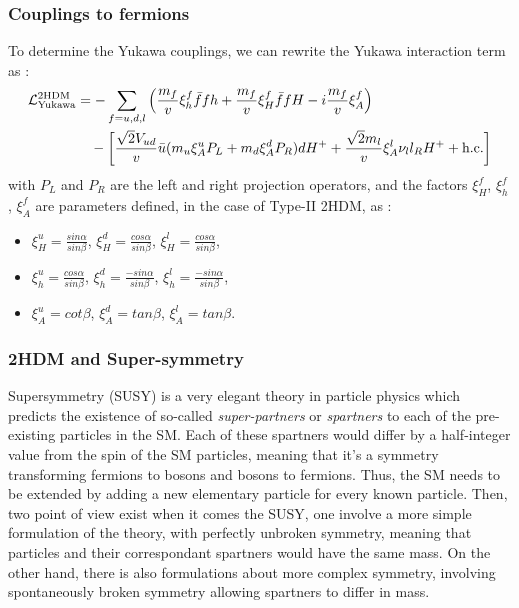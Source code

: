 \documentclass [12pt] {article}
\numberwithin{equation}{section} %
\numberwithin{figure}{section}   %
\begin{document}
\subsubsection*{Couplings to fermions}

To determine the Yukawa couplings, we can rewrite the Yukawa interaction term as :
\begin{equation}
\begin{split}
    \mathcal{L}_{\text{Yukawa}}^{\text{2HDM}} &= - \sum_{f = u,d,l} \left( \frac{m_f}{v} \xi^f_h \Bar{f} f h + \frac{m_f}{v} \xi^f_H \Bar{f} f H - i \frac{m_f}{v} \xi^{f}_A \right) \\
    &\quad - \left[ \frac{\sqrt{2}V_{ud}}{v} \Bar{u} (m_u \xi^u_A P_L + m_d \xi^d_A P_R) dH^+ + \frac{\sqrt{2}m_l}{v} \xi^l_A \nu_l l_R H^+ + \text{h.c.} \right]
\end{split}
\end{equation}
with $P_L$ and $P_R$ are the left and right projection operators, and the factors $\xi^f_H$, $\xi^f_h$, $\xi^f_A$ are parameters defined, in the case of Type-II 2HDM, as :
\begin{itemize}
    \item $\xi^u_H = \frac{sin \alpha}{sin \beta}$, $\xi^d_H =\frac{cos \alpha}{sin \beta}$, $\xi^l_H =\frac{cos \alpha}{sin \beta}$,
    \item $\xi^u_h = \frac{cos \alpha}{sin \beta}$, $\xi^d_h =\frac{-sin \alpha}{sin \beta}$, $\xi^l_h =\frac{-sin \alpha}{sin \beta}$,
    \item $\xi^u_A = cot \beta$, $\xi^d_A = tan \beta$, $\xi^l_A = tan \beta$.
\end{itemize}

\subsubsection*{2HDM and Super-symmetry}

Supersymmetry (SUSY) is a very elegant theory in particle physics which predicts the existence of so-called \textit{super-partners} or \textit{spartners} to each of the pre-existing particles in the SM. Each of these spartners would differ by a half-integer value from the spin of the SM particles, meaning that it's a symmetry transforming fermions to bosons and bosons to fermions. Thus, the SM needs to be extended by adding a new elementary particle for every known particle. Then, two point of view exist when it comes the SUSY, one involve a more simple formulation of the theory, with perfectly unbroken symmetry, meaning that particles and their correspondant spartners would have the same mass. On the other hand, there is also formulations about more complex symmetry, involving spontaneously broken symmetry allowing spartners to differ in mass.\\
\end{document}
